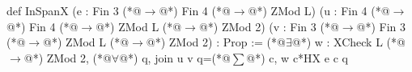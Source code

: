 def InSpanX (e : Fin 3 (*@$\to$@*) Fin 4 (*@$\to$@*) ZMod L)
    (u : Fin 4 (*@$\to$@*) Fin 4 (*@$\to$@*) ZMod L (*@$\to$@*) ZMod 2) (v : Fin 3 (*@$\to$@*) Fin 3 (*@$\to$@*) ZMod L (*@$\to$@*) ZMod 2) : Prop :=
  (*@$\exists$@*) w : XCheck L (*@$\to$@*) ZMod 2, (*@$\forall$@*) q, join u v q=(*@$\sum$@*) c, w c*HX e c q
